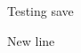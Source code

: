 \documentclass{article}
\author{Macro Kwarg Test}
\begin{document}
	Testing save
	
	New line \\
	
\end{document}
